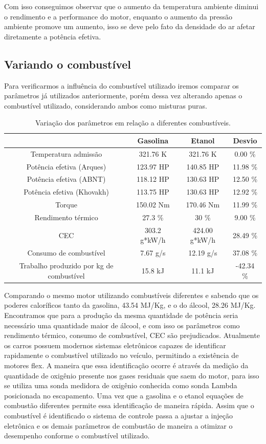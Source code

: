 \documentclass[a4paper]{article}
\begin{document}
Com isso conseguimos observar que o aumento da temperatura ambiente diminui o rendimento e a performance do motor, enquanto o aumento da pressão ambiente promove um aumento, isso se deve pelo fato da densidade do ar afetar diretamente a potência efetiva.

\subsection{Variando o combustível}
Para verificarmos a influência do combustível utilizado iremos comparar os parâmetros já utilizados anteriormente, porém dessa vez alterando apenas o combustível utilizado, considerando ambos como misturas puras.
\begin{table}[H]
    \centering
    \begin{tabular}{|c|c|c|c|}
    \hline
    & Gasolina & Etanol & Desvio\\
    \hline
    Temperatura admissão & 321.76 K & 321.76 K & 0.00 \%\\
    \hline
    Potência efetiva (Arques) & 123.97 HP & 140.85 HP & 11.98 \%\\
    \hline
    Potência efetiva (ABNT) & 118.12 HP & 130.63 HP & 12.50 \%\\
    \hline
    Potência efetiva (Khovakh) & 113.75 HP & 130.63 HP & 12.92 \%\\
    \hline
    Torque & 150.02 Nm & 170.46 Nm & 11.99 \%\\
    \hline
    Rendimento térmico & 27.3 \% & 30 \% & 9.00 \%\\
    \hline
    CEC & 303.2 g*kW/h & 424.00 g*kW/h & 28.49 \%\\
    \hline
    Consumo de combustível & 7.67 g/s & 12.19 g/s & 37.08 \%\\
    \hline
    Trabalho produzido por kg de combustível & 15.8 kJ & 11.1 kJ & -42.34 \%\\
    \hline
    \end{tabular}
    \caption{Variação dos parâmetros em relação a diferentes combustíveis.}
\end{table}
\vspace{3mm}

Comparando o mesmo motor utilizando combustíveis diferentes e sabendo que os poderes caloríficos tanto da gasolina, 43.54 MJ/Kg, e o do álcool, 28.26 MJ/Kg. Encontramos que para a produção da mesma quantidade de potência seria necessário uma quantidade maior de álcool, e com isso os parâmetros como rendimento térmico, consumo de combustível, CEC são prejudicados. Atualmente os carros possuem modernos sistemas eletrônicos capazes de identificar rapidamente o combustível utilizado no veículo, permitindo a existência de motores flex. A maneira que essa identificação ocorre é através da medição da quantidade de oxigênio presente nos gases residuais que saem do motor, para isso se utiliza uma sonda medidora de oxigênio conhecida como sonda Lambda posicionada no escapamento. Uma vez que a gasolina e o etanol equações de combustão diferentes permite essa identificação de maneira rápida. Assim que o combustível é identificado o sistema de controle passa a ajustar a injeção eletrônica e os demais parâmetros de combustão de maneira a otimizar o desempenho conforme o combustível utilizado.
\end{document}

